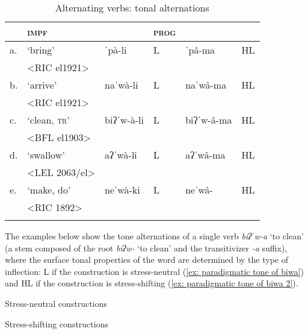 \begin{table}
\caption{Alternating verbs: tonal alternations}
\label{tab:paradigmatic-tone}

\begin{tabularx}{.8\textwidth}{llllll}
\lsptoprule
 & \textbf{\textsc{impf}}  & & \textbf{\textsc{prog}} &  &\\
 \midrule
a.& ‘bring’ &ˈpà-li	& L &   ˈpâ-ma   	& HL   \\
&<RIC el1921>\\
b.& `arrive' & naˈwà-li & L &   naˈwâ-ma & HL	\\
&<RIC el1921>\\
c.& ‘clean, \textsc{tr}' &  biʔˈw-à-li  & L 	& 	biʔˈw-â-ma  	& HL\\
&<BFL el1903>\\
d.& `swallow' &  aʔˈwà-li	& L    &	aʔˈwâ-ma	 &  HL\\
&<LEL 2063/el>\\
e.& `make, do' & neˈwà-ki 	& L  &    	neˈwâ-    &	HL\\
&<RIC 1892>\\
\lspbottomrule
\end{tabularx}

\end{table}

The examples below show the tone alternations of a single verb \textit{biʔˈw-a} ‘to clean’ (a stem composed of the root \textit{biʔw-} ‘to clean’ and the transitivizer \textit{-a} suffix), where the surface tonal properties of the word are determined by the type of inflection: L if the construction is stress-neutral (\ref{ex: paradigmatic tone of biwa}) and HL if the construction is stress-shifting (\ref{ex: paradigmatic tone of biwa 2}).

\ea\label{ex: paradigmatic tone of biwa}
{Stress-neutral constructions}

	\z
\z

\ea\label{ex: paradigmatic tone of biwa 2}
{Stress-shifting constructions}

